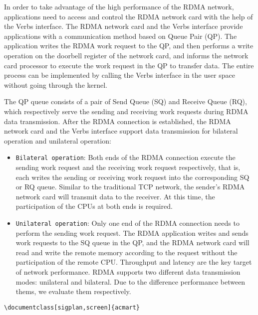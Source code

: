 \documentclass[sigplan,screen]{acmart}
\begin{document}
In order to take advantage of the high performance of the RDMA network, applications need to access and control the RDMA network card with the help of the Verbs interface. The RDMA network card and the Verbs interface provide applications with a communication method based on Queue Pair (QP). The application writes the RDMA work request to the QP, and then performs a write operation on the doorbell register of the network card, and informs the network card processor to execute the work request in the QP to transfer data. The entire process can be implemented by calling the Verbs interface in the user space without going through the kernel.

The QP queue consists of a pair of Send Queue (SQ) and Receive Queue (RQ), which respectively serve the sending and receiving work requests during RDMA data transmission. After the RDMA connection is established, the RDMA network card and the Verbs interface support data transmission for bilateral operation and unilateral operation:

\begin{itemize}
\item {\verb|Bilateral operation|}: Both ends of the RDMA connection execute the sending work request and the receiving work request respectively, that is, each writes the sending or receiving work request into the corresponding SQ or RQ queue. Similar to the traditional TCP network, the sender's RDMA network card will transmit data to the receiver. At this time, the participation of the CPUs at both ends is required.

\item {\verb|Unilateral operation|}: Only one end of the RDMA connection needs to perform the sending work request. The RDMA application writes and sends work requests to the SQ queue in the QP, and the RDMA network card will read and write the remote memory according to the request without the participation of the remote CPU.
Throughput and latency are the key target of network performance. RDMA supports two different data transmission modes: unilateral and bilateral. Due to the difference performance between thems, we evaluate them respectively.
\end{itemize}

\begin{verbatim}
\documentclass[sigplan,screen]{acmart}
\end{verbatim}
\end{document}
